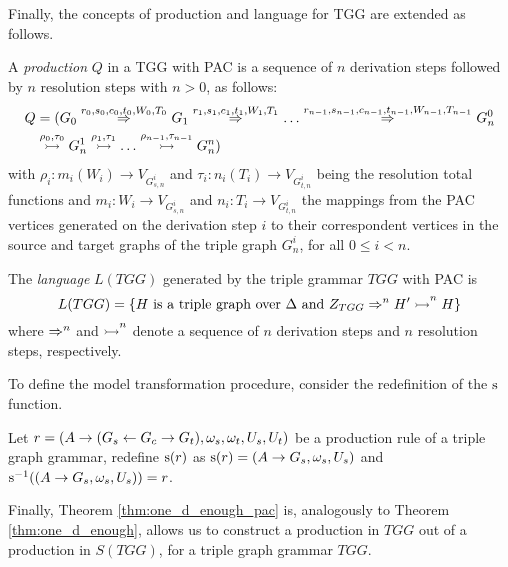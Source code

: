 Finally, the concepts of production and language for TGG are extended as follows.

\begin{definition}
	A \emph{production} $Q$ in a TGG with PAC is a sequence of $n$ derivation steps followed by $n$ resolution steps with $n > 0$, as follows:
	\begin{align*}
		Q & = (G_0 \derivpac{r_0}{s_0,c_0,t_0}{W_0,T_0}{} G_1 \derivpac{r_1}{s_1,c_1,t_1}{W_1,T_1}{} \dots \derivpac{r_{n-1}}{s_{n-1},c_{n-1},t_{n-1}}{W_{n-1},T_{n-1}}{} G_n^0 \\
		& \resolv{\rho_0,\tau_0} G_n^1 \resolv{\rho_1,\tau_1} \dots \resolv{\rho_{n-1},\tau_{n-1}} G_n^n)
	\end{align*}
	with $\rho_i: m_i(W_i) \to V_{G_{s,n}^i}$ and $\tau_i: n_i(T_i) \to V_{G_{t,n}^i}$ being the resolution total functions and $m_i : W_i \to V_{G_{s,n}^i}$ and $n_i : T_i \to V_{G_{t,n}^i}$ the mappings from the PAC vertices generated on the derivation step $i$ to their correspondent vertices in the source and target graphs of the triple graph $G_n^i$, for all $0 \le i < n$.
\end{definition}

\begin{definition}
	The \emph{language} $L(TGG)$ generated by the triple grammar $TGG$ with PAC is
	\begin{equation*}
		L(TGG) = \{ H \text{ is a triple graph over } \Delta \text{ and } Z_{TGG} \Rightarrow^{n}_{} H' \overset{}{\rightarrowtail}^{n} H \}
	\end{equation*}
	where $\Rightarrow^{n}_{}$ and $\overset{}{\rightarrowtail}^{n}$ denote a sequence of $n$ derivation steps and $n$ resolution steps, respectively.
\end{definition}

To define the model transformation procedure, consider the redefinition of the $\operatorname{s}$ function.

\begin{definition}
	\label{def:sourcepac}
	Let $r = (A \to (G_s \overset{}{\leftarrow} G_c \overset{}{\rightarrow} G_t), \omega_s, \omega_t, U_s, U_t)$ be a production rule of a triple graph grammar, redefine $\operatorname{s}(r)$ as $\operatorname{s}(r) = (A \to G_s,\omega_s,U_s)$ and $\operatorname{s}^{-1}((A \to G_s,\omega_s,U_s)) = r$.
\end{definition}

Finally, Theorem \ref{thm:one_d_enough_pac} is, analogously to Theorem \ref{thm:one_d_enough}, allows us to construct a production in $TGG$ out of a production in $S(TGG)$, for a triple graph grammar $TGG$.


